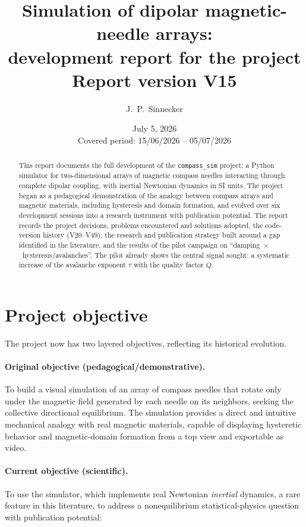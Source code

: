 \documentclass[11pt,a4paper]{article}
\title{\textbf{Simulation of dipolar magnetic-needle arrays:\\
development report for the \code{compass\_sim} project}\\[1ex]
\large Report version V15}
\author{J.~P.~Sinnecker}
\date{July 5, 2026\\[0.5ex]
\small Covered period: 15/06/2026 -- 05/07/2026}
\newcommand{\code}[1]{\texttt{#1}}
\begin{document}
\maketitle

\begin{abstract}
\noindent
This report documents the full development of the \code{compass\_sim} project: a Python simulator for two-dimensional arrays of magnetic compass needles interacting through complete dipolar coupling, with inertial Newtonian dynamics in SI units. The project began as a pedagogical demonstration of the analogy between compass arrays and magnetic materials, including hysteresis and domain formation, and evolved over six development sessions into a research instrument with publication potential. The report records the project decisions, problems encountered and solutions adopted, the code-version history (V20--V49), the research and publication strategy built around a gap identified in the literature, and the results of the pilot campaign on ``damping~$\times$~hysteresis/avalanches''. The pilot already shows the central signal sought: a systematic increase of the avalanche exponent $\tau$ with the quality factor $Q$.
\end{abstract}

\tableofcontents
\newpage

\section{Project objective}

The project now has two layered objectives, reflecting its historical evolution.

\paragraph{Original objective (pedagogical/demonstrative).}
To build a visual simulation of an array of compass needles that rotate only under the magnetic field generated by each needle on its neighbors, seeking the collective directional equilibrium. The simulation provides a direct and intuitive mechanical analogy with real magnetic materials, capable of displaying hysteretic behavior and magnetic-domain formation from a top view and exportable as video.

\paragraph{Current objective (scientific).}
To use the simulator, which implements real Newtonian \emph{inertial} dynamics, a rare feature in this literature, to address a nonequilibrium statistical-physics question with publication potential:
\end{document}
